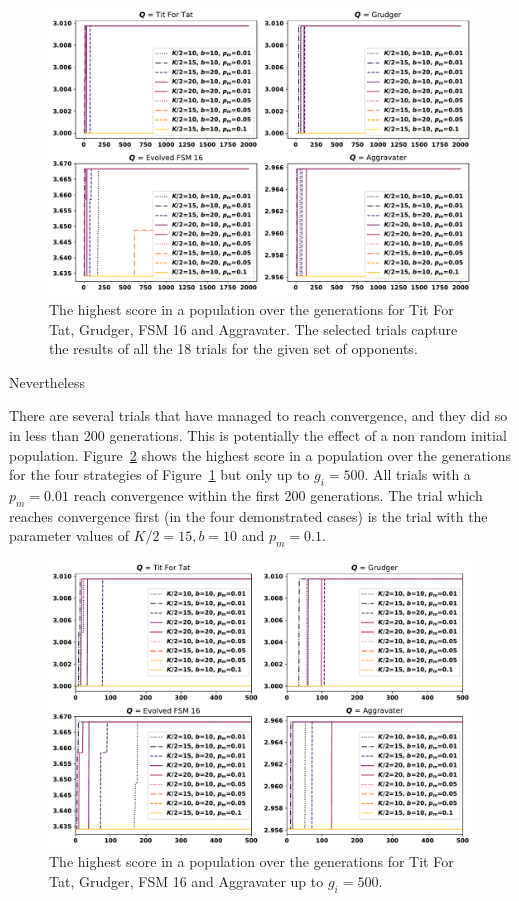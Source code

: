\begin{figure}[!htbp]
    \centering
    \includegraphics[width=.9\textwidth]{src/chapters/06/img/gas_results_per_trial.pdf}
    \caption{The highest score in a population over the generations for Tit For Tat,
    Grudger, FSM 16 and Aggravater. The selected trials capture the results
    of all the 18 trials for the given set of opponents.}\label{fig:ga_trials}
\end{figure}

Nevertheless %

There are several trials that have managed to reach convergence,
and they did so in less than 200 generations. This is potentially the effect of a
non random initial population.
Figure~\ref{fig:ga_trials_to_500}
shows the highest score in a population over the generations for the four
strategies of Figure~\ref{fig:ga_trials} but only up to \(g_i = 500\). All trials
with a \(p_m=0.01\) reach convergence within the first 200 generations. The trial
which reaches convergence first (in the four demonstrated cases) is the trial
with the parameter values of \(K/2=15, b=10\) and \(p_m=0.1\).

\begin{figure}[!htbp]
    \centering
    \includegraphics[width=.9\textwidth]{src/chapters/06/img/gas_results_per_trial_to_generation_500.pdf}
    \caption{The highest score in a population over the generations for Tit For Tat,
    Grudger, FSM 16 and Aggravater up to \(g_i = 500\).}\label{fig:ga_trials_to_500}
\end{figure}

